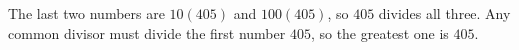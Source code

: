 The last two numbers are $ 10(405)$ and $ 100(405)$, so $ 405 $ divides all three. Any common divisor must divide the first number $ 405 $, so the greatest one is $\boxed{405}$.
